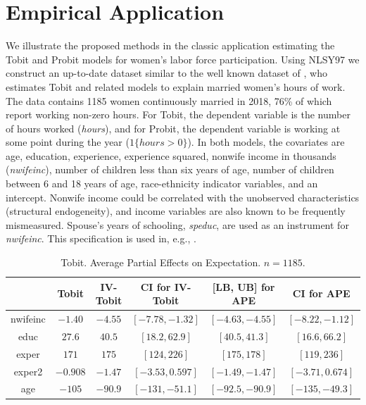 \documentclass[12pt]{article}
\begin{document}
\bigskip

\section{Empirical Application}\label{sec:Empirical}

We illustrate the proposed methods in the classic application estimating the Tobit and Probit
models for women's labor force participation. Using NLSY97 we construct an up-to-date dataset similar to the well known dataset of \cite{Mroz1987Ecta}, who estimates Tobit and related models to explain
married women's hours of work. The data contains 1185 women continuously married in 2018, 76\% of which
report working non-zero hours. For Tobit, the dependent variable is the
number of hours worked (\textit{hours}), and for Probit, the dependent
variable is working at some point during the year ($1\{hours>0\}$). In both
models, the covariates are age, education, experience, experience squared,
nonwife income in thousands (\textit{nwifeinc}), number of children less
than six years of age, number of children between 6 and 18 years of age, race-ethnicity indicator variables, 
and an intercept. Nonwife income could be correlated with the unobserved
characteristics (structural endogeneity), and income variables are also
known to be frequently mismeasured. Spouse's years of schooling, \textit{speduc},  are used as an
instrument for \textit{nwifeinc}. This specification is used in, e.g., \cite%
{Wooldridge2010Book}. 

\begin{table}[!h]
  \begin{center}
  \begin{tabular}{|c|c|cc|cc|}
    \hline\hline
   &  Tobit & IV-Tobit & CI for IV-Tobit & [LB, UB] for APE & CI for APE\\ \hline
    nwifeinc &  $-1.40$ & $-4.55$ & $[-7.78,-1.32]$ & $[-4.63,-4.55]$ & $[-8.22,-1.12]$\\ 
    educ &  $27.6$ & $40.5$ & $[18.2,62.9]$ & $[40.5,41.3]$ & $[16.6,66.2]$\\ 
    exper &  $171$ & $175$ & $[124,226]$ & $[175,178]$ & $[119,236]$\\ 
    exper2 &  $-0.908$ & $-1.47$ & $[-3.53,0.597]$ & $[-1.49,-1.47]$ & $[-3.71,0.674]$\\ 
    age &  $-105$ & $-90.9$ & $[-131,-51.1]$ & $[-92.5,-90.9]$ & $[-135,-49.3]$\\ 
  \hline\hline
  \end{tabular}
  \caption{Tobit. Average Partial Effects on Expectation. $n=1185$.}
  \label{table:Emp-Tobit-PEM-E-w-CI}
  \end{center}
\end{table}
\end{document}
